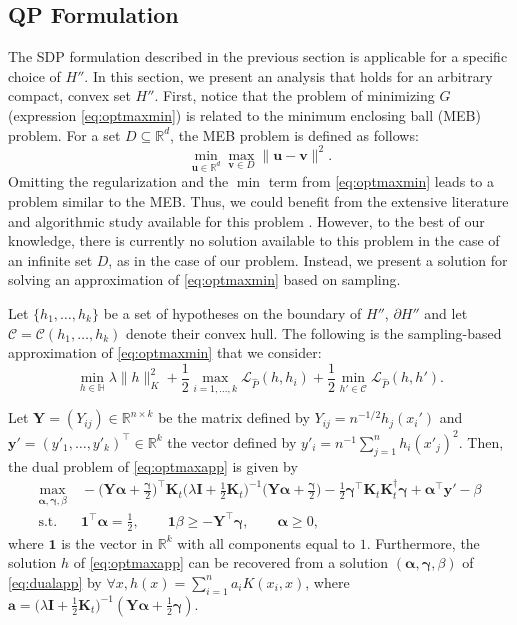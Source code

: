 \documentclass[twoside,11pt]{article}
\def\Rset{\mathbb{R}}
\def\Hset{\mathbb{H}}
\providecommand{\norm}[2]{\lVert#1\rVert_{#2}}
\newcommand{\h}{\widehat}
\newcommand{\cL}{{\mathcal L}}
\newcommand{\mat}[1]{{\mathbf #1}}
\newcommand{\1}{\mat{1}}
\newcommand{\bu}{\mat{u}}
\newcommand{\bv}{\mat{v}}
\newcommand{\Kt}{\mat{K}_{t}}
\newcommand{\y}{\mat{y}}
\newcommand{\I}{\mat{I}}
\begin{document}
\subsection{QP Formulation}
\label{sec:optimizationqp}

The SDP formulation described in the previous section is applicable
for a specific choice of $H''$. In this section, we present an
analysis that holds for an arbitrary compact, convex set $H''$. First, notice
that the problem of minimizing $G$ (expression \eqref{eq:optmaxmin}) is
related to the minimum enclosing ball (MEB) problem.  For a set
$D \subseteq \Rset^d$, the MEB problem is defined as follows:
\begin{equation*}
  \min_{\bu \in \Rset^d}\max_{\bv \in D} \|\bu - \bv\|^2.
\end{equation*}
Omitting the regularization and the $\min$ term from
\eqref{eq:optmaxmin} leads to a problem similar to the MEB.  Thus, we
could benefit from the extensive literature and algorithmic study
available for this problem
\citep{Kumar03,schonherr,Yildirim2008}.
However, to the best of our knowledge, there is currently no
solution available to this problem in the case of an infinite
set $D$, as in the case of our problem.
Instead, we present a solution for solving an approximation of
\eqref{eq:optmaxmin} based on sampling.

Let $\{h_1, \ldots, h_k\}$ be a set of hypotheses on the boundary of
$H''$, $\partial H''$
and let $\mathcal{C} = \mathcal{C}(h_1, \ldots, h_k)$ denote their
convex hull. The following is the sampling-based approximation of
\eqref{eq:optmaxmin} that we consider:
\begin{equation}
\label{eq:optmaxapp}
\min_{h \in \Hset} \lambda \norm{h}{K}^2 +
 \frac{1}{2} \max_{i=1,...,k} \cL_{\h P}(h, h_i) + \frac{1}{2}
 \min_{h' \in  \mathcal{C}} \cL_{\h P }(h, h').
\end{equation}

\begin{proposition}
\label{prop:dual}
Let $\mat Y =(Y_{ij}) \in \Rset^{n \times k}$ be the
matrix defined by $Y_{ij} = n^{-1/2} h_j(x_i')$ and
$\y' = (y'_1, \ldots, y'_k)^\top \in \Rset^k $ the vector defined by
$y'_i = n^{-1} \sum_{j=1}^n h_i(x'_j)^2$. Then, the dual problem of
\eqref{eq:optmaxapp} is given by
\begin{align}
\label{eq:dualapp}
\max_{\bm \alpha, \bm \gamma, \beta} & \ -\Big(\mat Y \bm \alpha + \frac{\bm
  \gamma}{2} \Big)^\top \Kt\Big(\lambda \I + \frac{1}{2}\Kt\Big)^{-1}
\Big(\mat Y \bm \alpha  + \frac{\bm \gamma}{2}\Big)
 - \frac{1}{2} \bm \gamma^\top \Kt \Kt^\dag \bm \gamma
+  \bm \alpha^\top \y' - \beta \\
\text{s.t.} & \ \1^\top \bm \alpha = \frac{1}{2}, \qquad  \1
\beta \geq -\mat Y^\top \bm \gamma, \qquad \bm \alpha\geq
0, \nonumber
\end{align}
where $\1$ is the vector in $\Rset^k$ with all components equal to
$1$. Furthermore, the solution $h$ of \eqref{eq:optmaxapp} can be
recovered from a solution $(\bm \alpha, \bm \gamma, \beta)$ of
\eqref{eq:dualapp} by $\forall x, h(x) =\sum_{i = 1}^n a_i K(x_i, x)$,
where $\bm a = \big(\lambda \I + \frac{1}{2}\Kt)^{-1}(\mat Y \bm
\alpha + \frac{1}{2}\bm \gamma)$.
\end{proposition}
\end{document}
